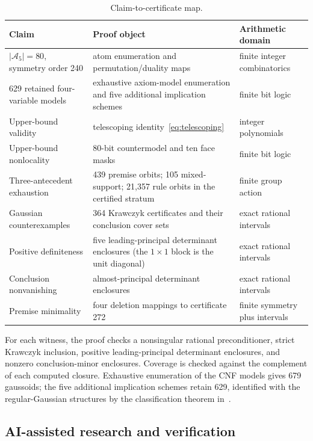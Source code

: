 \documentclass[10pt]{article}
\theoremstyle{definition}
\newcommand{\A}{\mathcal A}
\begin{document}
\begin{table}[ht]
\centering
\caption{Claim-to-certificate map.}
\label{tab:architecture}
\small
\begin{tabular}{P{3.0cm}P{5.4cm}P{3.8cm}}
\toprule
Claim & Proof object & Arithmetic domain\\
\midrule
$|\A_5|=80$, symmetry order 240 & atom enumeration and permutation/duality maps & finite integer combinatorics\\
629 retained four-variable models & exhaustive axiom-model enumeration and five additional implication schemes & finite bit logic\\
Upper-bound validity & telescoping identity~\eqref{eq:telescoping} & integer polynomials\\
Upper-bound nonlocality & 80-bit countermodel and ten face masks & finite bit logic\\
Three-antecedent exhaustion & 439 premise orbits; 105 mixed-support; 21,357 rule orbits in the certified stratum & finite group action\\
Gaussian counterexamples & 364 Krawczyk certificates and their conclusion cover sets & exact rational intervals\\
Positive definiteness & five leading-principal determinant enclosures (the $1\times1$ block is the unit diagonal) & exact rational intervals\\
Conclusion nonvanishing & almost-principal determinant enclosures & exact rational intervals\\
Premise minimality & four deletion mappings to certificate 272 & finite symmetry plus intervals\\
\bottomrule
\end{tabular}
\end{table}

For each witness, the proof checks a nonsingular rational preconditioner, strict Krawczyk inclusion, positive leading-principal determinant enclosures, and nonzero conclusion-minor enclosures.  Coverage is checked against the complement of each computed closure.  Exhaustive enumeration of the CNF models gives 679 gaussoids; the five additional implication schemes retain 629, identified with the regular-Gaussian structures by the classification theorem in~\cite{LM2007}.

\subsection{AI-assisted research and verification}
\end{document}
